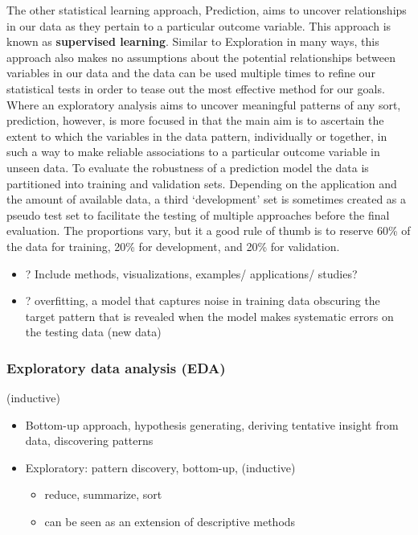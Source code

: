 \documentclass[
]{article}
\providecommand{\tightlist}{%
  \setlength{\itemsep}{0pt}\setlength{\parskip}{0pt}}
\begin{document}
The other statistical learning approach, Prediction, aims to uncover relationships in our data as they pertain to a particular outcome variable. This approach is known as \textbf{supervised learning}. Similar to Exploration in many ways, this approach also makes no assumptions about the potential relationships between variables in our data and the data can be used multiple times to refine our statistical tests in order to tease out the most effective method for our goals. Where an exploratory analysis aims to uncover meaningful patterns of any sort, prediction, however, is more focused in that the main aim is to ascertain the extent to which the variables in the data pattern, individually or together, in such a way to make reliable associations to a particular outcome variable in unseen data. To evaluate the robustness of a prediction model the data is partitioned into training and validation sets. Depending on the application and the amount of available data, a third `development' set is sometimes created as a pseudo test set to facilitate the testing of multiple approaches before the final evaluation. The proportions vary, but it a good rule of thumb is to reserve 60\% of the data for training, 20\% for development, and 20\% for validation.

\begin{itemize}
\item
  ? Include methods, visualizations, examples/ applications/ studies?
\item
  ? overfitting, a model that captures noise in training data obscuring the target pattern that is revealed when the model makes systematic errors on the testing data (new data)
\end{itemize}

\hypertarget{exploratory-data-analysis-eda}{%
\subsubsection{Exploratory data analysis (EDA)}\label{exploratory-data-analysis-eda}}

(inductive)

\begin{itemize}
\item
  Bottom-up approach, hypothesis generating, deriving tentative insight from data, discovering patterns
\item
  Exploratory: pattern discovery, bottom-up, (inductive)

  \begin{itemize}
  \tightlist
  \item
    reduce, summarize, sort
  \item
    can be seen as an extension of descriptive methods
  \end{itemize}
\end{itemize}
\end{document}
